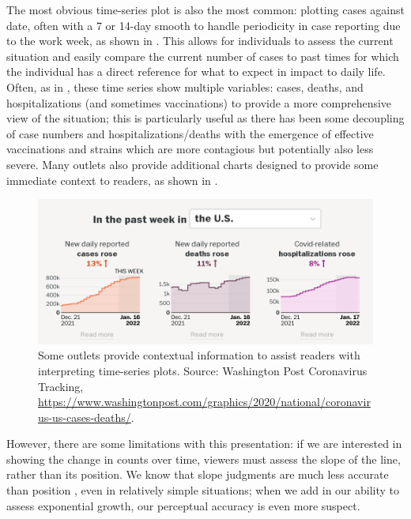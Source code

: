 \documentclass[article]{jdssv}\usepackage[]{graphicx}\usepackage[]{color}
\begin{document}
The most obvious time-series plot is also the most common: plotting cases against date, often with a 7 or 14-day smooth to handle periodicity in case reporting due to the work week, as shown in . This allows for individuals to assess the current situation and easily compare the current number of cases to past times for which the individual has a direct reference for what to expect in impact to daily life. Often, as in , these time series show multiple variables: cases, deaths, and hospitalizations (and sometimes vaccinations) to provide a more comprehensive view of the situation; this is particularly useful as there has been some decoupling of case numbers and hospitalizations/deaths with the emergence of effective vaccinations and strains which are more contagious but potentially also less severe. Many outlets also provide additional charts designed to provide some immediate context to readers, as shown in . 

\begin{figure}
\centering
\includegraphics[width=.5\linewidth]{wapo-covid-context}
\caption{Some outlets provide contextual information to assist readers with interpreting time-series plots. Source: Washington Post Coronavirus Tracking, \url{https://www.washingtonpost.com/graphics/2020/national/coronavirus-us-cases-deaths/}.}
\label{fig:wapo-context}
\end{figure}

However, there are some limitations with this presentation: if we are interested in showing the change in counts over time, viewers must assess the slope of the line, rather than its position. We know that slope judgments are much less accurate than position \citep{clevelandGraphicalPerceptionVisual1987}, even in relatively simple situations; when we add in our ability to assess exponential growth, our perceptual accuracy is even more suspect.
\end{document}
